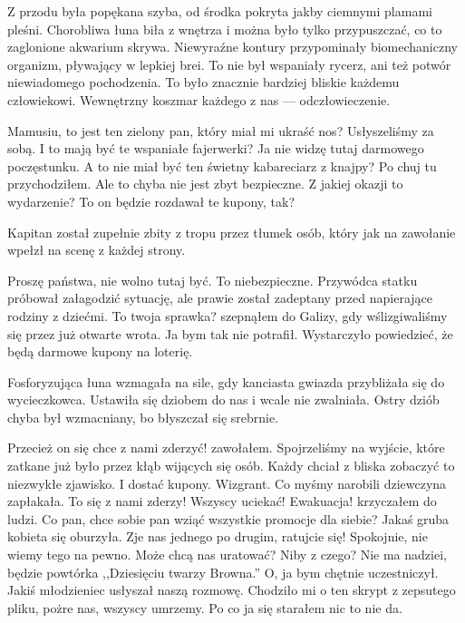 Z przodu była popękana szyba, od środka pokryta jakby ciemnymi plamami pleśni.
Chorobliwa łuna biła z wnętrza i można było tylko przypuszczać, co to zaglonione akwarium skrywa.
Niewyraźne kontury przypominały biomechaniczny organizm, pływający w lepkiej brei.
To nie był wspaniały rycerz, ani też potwór niewiadomego pochodzenia. 
To było znacznie bardziej bliskie każdemu człowiekowi.
Wewnętrzny koszmar każdego z nas --- odczłowieczenie.

\begin{dialogue}
	\ds{} Mamusiu, to jest ten zielony pan, który miał mi ukraść nos? \dm{} Usłyszeliśmy za sobą.
	\ds{} I to mają być te wspaniałe fajerwerki?
	\ds{} Ja nie widzę tutaj darmowego poczęstunku.
	\ds{} A to nie miał być ten świetny kabareciarz z knajpy?
	\ds{} Po chuj tu przychodziłem.
	\ds{} Ale to chyba nie jest zbyt bezpieczne.
	\ds{} Z jakiej okazji to wydarzenie?
	\ds{} To on będzie rozdawał te kupony, tak?
\end{dialogue}

Kapitan został zupełnie zbity z tropu przez tłumek osób, który jak na zawołanie wpełzł na scenę z każdej strony.

\begin{dialogue}
	\dm{} Proszę państwa, nie wolno tutaj być. To niebezpieczne. \dm{} Przywódca statku próbował załagodzić sytuację, ale prawie został zadeptany przed napierające rodziny z dziećmi.
	\ds{} To twoja sprawka? \dm{} szepnąłem do Galizy, gdy wślizgiwaliśmy się przez już otwarte wrota. \dm{} Ja bym tak nie potrafił.
	\ds{} Wystarczyło powiedzieć, że będą darmowe kupony na loterię. 
\end{dialogue}

Fosforyzująca łuna wzmagała na sile, gdy kanciasta gwiazda przybliżała się do wycieczkowca.
Ustawiła się dziobem do nas i wcale nie zwalniała.
Ostry dziób chyba był wzmacniany, bo błyszczał się srebrnie.

\begin{dialogue}
	\ds{} Przecież on się chce z nami zderzyć! \dm{} zawołałem. Spojrzeliśmy na wyjście, które zatkane już było przez kłąb wijących się osób. Każdy chciał z bliska zobaczyć to niezwykłe zjawisko. I dostać kupony.
	\ds{} Wizgrant. Co myśmy narobili \dm{} dziewczyna zapłakała.
	\ds{} To się z nami zderzy! Wszyscy uciekać! Ewakuacja! \dm{} krzyczałem do ludzi.
	\ds{} Co pan, chce sobie pan wziąć wszystkie promocje dla siebie? \dm{} Jakaś gruba kobieta się oburzyła.
	\ds{} Zje nas jednego po drugim, ratujcie się!
	\ds{} Spokojnie, nie wiemy tego na pewno. Może chcą nas uratować?
	\ds{} Niby z czego? Nie ma nadziei, będzie powtórka ,,Dziesięciu twarzy Browna.''
	\ds{} O, ja bym chętnie uczestniczył. \dm{} Jakiś młodzieniec usłyszał naszą rozmowę.
	\ds{} Chodziło mi o ten skrypt z zepsutego pliku, pożre nas, wszyscy umrzemy. \dm{} Po co ja się starałem nic to nie da.
\end{dialogue}

